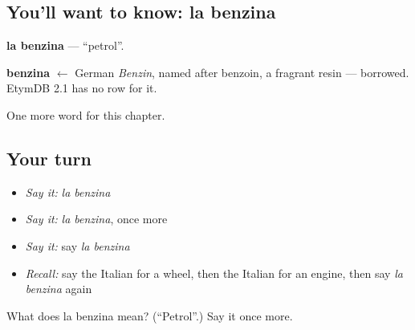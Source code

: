 \subsection*{You'll want to know: la benzina}
\textbf{la benzina} — \textquotedblleft{}petrol\textquotedblright{}.

\begin{cousinweb}
\textbf{benzina} $\leftarrow$ German \emph{Benzin}, named after benzoin, a fragrant resin — borrowed. EtymDB 2.1 has no row for it.
\end{cousinweb}

\begin{grammarlens}[title={What you've built}]
One more word for this chapter.
\end{grammarlens}

\subsection*{Your turn}
\begin{itemize}
\raggedright
  \item \emph{Say it:} \emph{la benzina}
  \item \emph{Say it:} \emph{la benzina}, once more
  \item \emph{Say it:} say \emph{la benzina}
  \item \emph{Recall:} say the Italian for a wheel, then the Italian for an engine, then say \emph{la benzina} again
\end{itemize}

\begin{tcolorbox}[breakable,colback=teal!4,colframe=teal!35!black,title={Before you move on}]
What does la benzina mean? (\textquotedblleft{}Petrol\textquotedblright{}.) Say it once more.
\end{tcolorbox}
